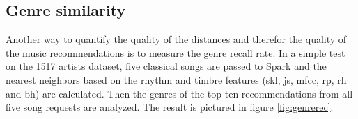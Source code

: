 \subsection{Genre similarity}\label{genrerec}

Another way to quantify the quality of the distances and therefor the quality of the music recommendations is to measure the genre recall rate. In a simple test on the 1517 artists dataset, five classical songs are passed to Spark and the nearest neighbors based on the rhythm and timbre features (skl, js, mfcc, rp, rh and bh) are calculated. Then the genres of the top ten recommendations from all five song requests are analyzed. The result is pictured in figure \ref{fig:genrerec}.  

\begin{figure}[htbp]
	\centering
\end{figure}
